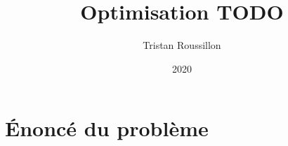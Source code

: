 \documentclass{beamer}
\title[]
 {Optimisation TODO}
\author[T. Roussillon]
 {Tristan Roussillon}
\date{2020}
\institute{INSA Lyon, TC}
\begin{document}
\begin{frame}
  \titlepage
\end{frame}




\section{\'Enoncé du problème}
\end{document}
